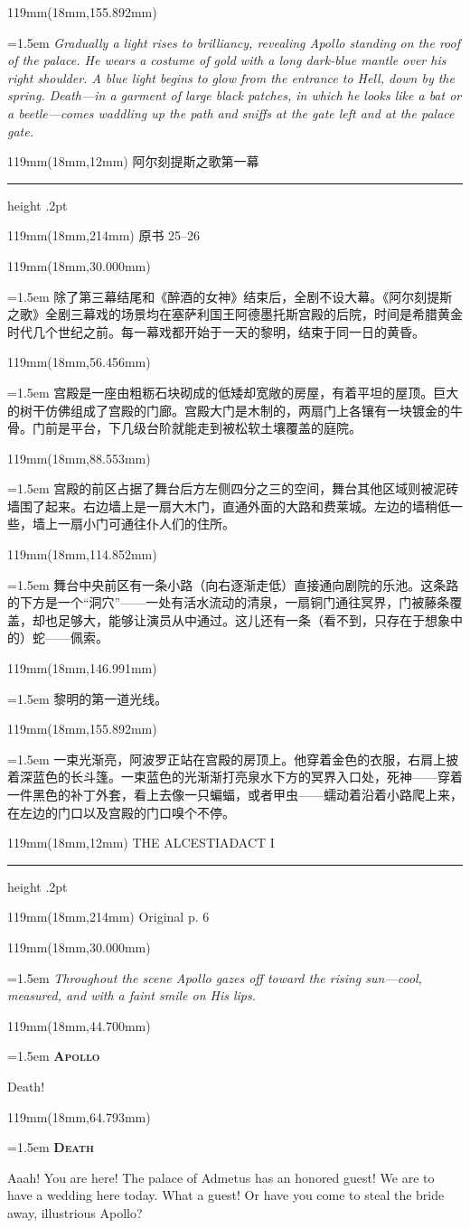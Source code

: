 \documentclass{article}
\newcommand{\ENsetup}{\normalfont\color{ink}\fontsize{11}{16.5}\selectfont\emergencystretch=1.5em}
\newcommand{\ZHsetup}{\normalfont\color{ink}\fontsize{10.5}{17}\selectfont\emergencystretch=1.5em}
\newcommand{\ENspeaker}[1]{{\fontsize{9.8}{13}\selectfont\scshape\bfseries #1}\par\vspace{3pt}}
\newcommand{\ENstage}[1]{\par\noindent{\itshape #1}\par}
\newcommand{\Block}[3]{\begin{textblock*}{119mm}(18mm,#1mm){#2 #3\par}\end{textblock*}}
\newcommand{\Heading}[3]{%
  \begin{textblock*}{119mm}(18mm,12mm)
    \color{quiet}\fontsize{7.5}{10}\selectfont
    #1\hfill #2\par\vspace{3mm}\hrule height .2pt
  \end{textblock*}
  \begin{textblock*}{119mm}(18mm,214mm)
    \color{quiet}\fontsize{7}{10}\selectfont #3\hfill\thepage
  \end{textblock*}
}
\begin{document}
\Block{155.892}{\ENsetup}{\itshape 
Gradually a light rises to brilliancy, revealing Apollo standing on the roof of the palace. He wears a costume of gold with a long dark-blue mantle over his right shoulder. A blue light begins to glow from the entrance to Hell, down by the spring. Death—in a garment of large black patches, in which he looks like a bat or a beetle—comes waddling up the path and sniffs at the gate left and at the palace gate.\par}
\newpage
\null
\Heading{阿尔刻提斯之歌}{第一幕}{原书 25–26}
\Block{30.000}{\ZHsetup}{\kai 除了第三幕结尾和《醉酒的女神》结束后，全剧不设大幕。《阿尔刻提斯之歌》全剧三幕戏的场景均在塞萨利国王阿德墨托斯宫殿的后院，时间是希腊黄金时代几个世纪之前。每一幕戏都开始于一天的黎明，结束于同一日的黄昏。\par }
\Block{56.456}{\ZHsetup}{\kai 宫殿是一座由粗粝石块砌成的低矮却宽敞的房屋，有着平坦的屋顶。巨大的树干仿佛组成了宫殿的门廊。宫殿大门是木制的，两扇门上各镶有一块镀金的牛骨。门前是平台，下几级台阶就能走到被松软土壤覆盖的庭院。\par }
\Block{88.553}{\ZHsetup}{\kai 宫殿的前区占据了舞台后方左侧四分之三的空间，舞台其他区域则被泥砖墙围了起来。右边墙上是一扇大木门，直通外面的大路和费莱城。左边的墙稍低一些，墙上一扇小门可通往仆人们的住所。\par }
\Block{114.852}{\ZHsetup}{\kai 舞台中央前区有一条小路{\kai （向右逐渐走低）}直接通向剧院的乐池。这条路的下方是一个“洞穴”——一处有活水流动的清泉，一扇铜门通往冥界，门被藤条覆盖，却也足够大，能够让演员从中通过。这儿还有一条{\kai （看不到，只存在于想象中的）}蛇——佩索。\par }
\Block{146.991}{\ZHsetup}{\kai 黎明的第一道光线。\par }
\Block{155.892}{\ZHsetup}{\kai 一束光渐亮，阿波罗正站在宫殿的房顶上。他穿着金色的衣服，右肩上披着深蓝色的长斗篷。一束蓝色的光渐渐打亮泉水下方的冥界入口处，死神——穿着一件黑色的补丁外套，看上去像一只蝙蝠，或者甲虫——蠕动着沿着小路爬上来，在左边的门口以及宫殿的门口嗅个不停。\par }
\newpage
\null
\Heading{THE ALCESTIAD}{ACT I}{Original p. 6}
\Block{30.000}{\ENsetup}{\itshape 
Throughout the scene Apollo gazes off toward the rising sun—cool, measured, and with a faint smile on His lips.\par}
\Block{44.700}{\ENsetup}{\ENspeaker{Apollo}
\ENstage{Like a ``Good morning.''}
Death!\par}
\Block{64.793}{\ENsetup}{\ENspeaker{Death}
Aaah! You are here! The palace of Admetus has an honored guest! We are to have a wedding here today. What a guest! Or have you come to steal the bride away, illustrious Apollo?\par}
\end{document}
